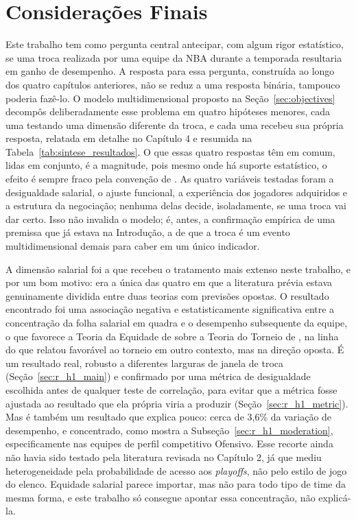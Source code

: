 \chapter{Considerações Finais}
\label{chp:conclusion}

Este trabalho tem como pergunta central antecipar, com algum rigor estatístico, se uma troca realizada por uma equipe da NBA durante a temporada resultaria em ganho de desempenho. A resposta para essa pergunta, construída ao longo dos quatro capítulos anteriores, não se reduz a uma resposta binária, tampouco poderia fazê-lo. O modelo multidimensional proposto na Seção~\ref{sec:objectives} decompôs deliberadamente esse problema em quatro hipóteses menores, cada uma testando uma dimensão diferente da troca, e cada uma recebeu sua própria resposta, relatada em detalhe no Capítulo 4 e resumida na Tabela~\ref{tab:sintese_resultados}. O que essas quatro respostas têm em comum, lidas em conjunto, é a magnitude, pois mesmo onde há suporte estatístico, o efeito é sempre fraco pela convenção de \citet{cohen1988}. As quatro variáveis testadas foram a desigualdade salarial, o ajuste funcional, a experiência dos jogadores adquiridos e a estrutura da negociação; nenhuma delas decide, isoladamente, se uma troca vai dar certo. Isso não invalida o modelo; é, antes, a confirmação empírica de uma premissa que já estava na Introdução, a de que a troca é um evento multidimensional demais para caber em um único indicador.

A dimensão salarial foi a que recebeu o tratamento mais extenso neste trabalho, e por um bom motivo: era a única das quatro em que a literatura prévia estava genuinamente dividida entre duas teorias com previsões opostas. O resultado encontrado foi uma associação negativa e estatisticamente significativa entre a concentração da folha salarial em quadra e o desempenho subsequente da equipe, o que favorece a Teoria da Equidade de \citet{adams1965} sobre a Teoria do Torneio de \citet{lazear1981}, na linha do que \citet{frick2003} relatou favorável ao torneio em outro contexto, mas na direção oposta. É um resultado real, robusto a diferentes larguras de janela de troca (Seção~\ref{sec:r_h1_main}) e confirmado por uma métrica de desigualdade escolhida antes de qualquer teste de correlação, para evitar que a métrica fosse ajustada ao resultado que ela própria viria a produzir (Seção~\ref{sec:r_h1_metric}). Mas é também um resultado que explica pouco: cerca de 3,6\% da variação de desempenho, e concentrado, como mostra a Subseção~\ref{sec:r_h1_moderation}, especificamente nas equipes de perfil competitivo Ofensivo. Esse recorte ainda não havia sido testado pela literatura revisada no Capítulo 2, já que \citet{katayama2011} mediu heterogeneidade pela probabilidade de acesso aos \textit{playoffs}, não pelo estilo de jogo do elenco. Equidade salarial parece importar, mas não para todo tipo de time da mesma forma, e este trabalho só consegue apontar essa concentração, não explicá-la.

